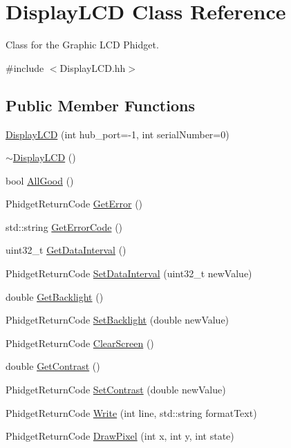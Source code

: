 \hypertarget{classDisplayLCD}{}\section{Display\+L\+CD Class Reference}
\label{classDisplayLCD}


Class for the Graphic L\+CD Phidget.  




{\ttfamily \#include $<$Display\+L\+C\+D.\+hh$>$}

\subsection*{Public Member Functions}
\begin{DoxyCompactItemize}
\item 
\hyperlink{classDisplayLCD_a04f74ffd3ac0f9499ae3d8941ed27f9c}{Display\+L\+CD} (int hub\+\_\+port=-\/1, int serial\+Number=0)
\item 
\hyperlink{classDisplayLCD_ac6ed1397321b6faae3bfb2b24bed8035}{$\sim$\+Display\+L\+CD} ()
\item 
bool \hyperlink{classDisplayLCD_ada423180074b506b76c1bce2ee0762bd}{All\+Good} ()
\item 
Phidget\+Return\+Code \hyperlink{classDisplayLCD_aa1c6e2464e7a21f1d2298efb50f4f5cf}{Get\+Error} ()
\item 
std\+::string \hyperlink{classDisplayLCD_af29a65af420a16e9995e7e2187e4af99}{Get\+Error\+Code} ()
\item 
uint32\+\_\+t \hyperlink{classDisplayLCD_a4d5cb25aaf17312c7639422f44df7071}{Get\+Data\+Interval} ()
\item 
Phidget\+Return\+Code \hyperlink{classDisplayLCD_a07fef3e48aaccd4c66931ee886945e5d}{Set\+Data\+Interval} (uint32\+\_\+t new\+Value)
\item 
double \hyperlink{classDisplayLCD_af9aa55093dd8b4a11489b2e490aed8cc}{Get\+Backlight} ()
\item 
Phidget\+Return\+Code \hyperlink{classDisplayLCD_acd9635087f3d813a39aa0b266f05203a}{Set\+Backlight} (double new\+Value)
\item 
Phidget\+Return\+Code \hyperlink{classDisplayLCD_ac3ea2662388a42733fbf525f3d933be7}{Clear\+Screen} ()
\item 
double \hyperlink{classDisplayLCD_ab7ec5dfb25093bf45480807989db4049}{Get\+Contrast} ()
\item 
Phidget\+Return\+Code \hyperlink{classDisplayLCD_a4e97d5bbd320dd69724809d3f446b578}{Set\+Contrast} (double new\+Value)
\item 
Phidget\+Return\+Code \hyperlink{classDisplayLCD_ab8c5e288a7ce5c0dde1806f821036bac}{Write} (int line, std\+::string format\+Text)
\item 
Phidget\+Return\+Code \hyperlink{classDisplayLCD_aa3417ad0c5f9097ae5124ef15b35f793}{Draw\+Pixel} (int x, int y, int state)
\end{DoxyCompactItemize}


